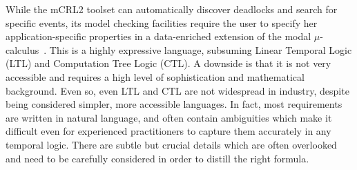 \documentclass[letter]{llncs}
\newcommand{\figshrink}{\vspace{-.6cm}}
\newcommand{\figshrinkend}{}
\begin{document}

While the mCRL2 toolset can automatically discover deadlocks and search
for specific events, its model checking facilities require the user to
specify her application-specific properties in a data-enriched extension
of the modal $\mu$-calculus~\cite{Groote05model-checkingprocesses}. 
This is a highly expressive language, subsuming Linear Temporal Logic
(LTL) and Computation Tree Logic (CTL). A downside is that
it is not very accessible and
requires a high level of sophistication and mathematical background.
Even so, even LTL and CTL are not widespread in industry, despite being
considered simpler, more accessible languages. In fact, most requirements
are written in natural language, and often contain ambiguities which
make it difficult even for experienced practitioners to capture them
accurately in any temporal logic. There are subtle but crucial details
which are often overlooked and need to be carefully considered in order
to distill the right formula.




\end{document}
